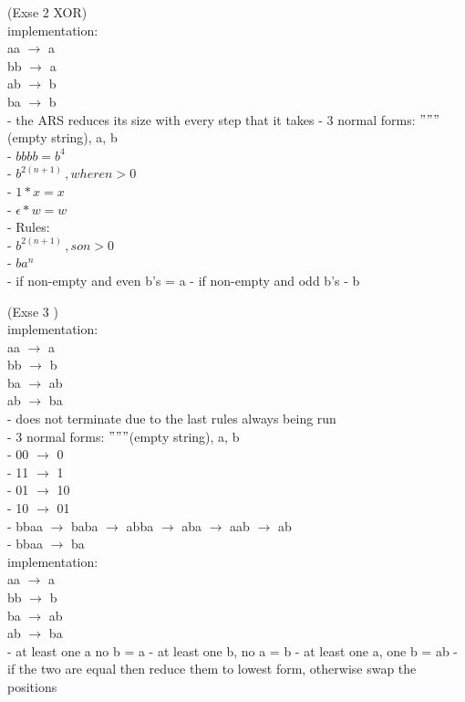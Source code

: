 \documentclass{article}
\theoremstyle{theorem}
\theoremstyle{definition}
\theoremstyle{remark}
\begin{document}
(Exse 2 XOR) \\ 
implementation: \\
aa $\to$ a \\
bb $\to$ a \\
ab $\to$ b \\
ba $\to$ b \\
- the ARS reduces its size with every step that it takes 
- 3 normal forms: $"""$ (empty string), a, b\\
- $bbbb = b^4$ \\
- $b^{2(n+1)} \, , where n > 0$ \\
- $1 * x = x$ \\
- $\epsilon * w = w$ \\

- Rules: \\
  - $b^{2(n+1)} \, , so n > 0$\\
  - $ba^n$\\
  - if non-empty and even b's = a 
  - if non-empty and odd b's - b


(Exse 3 ) \\ 
implementation: \\
aa $\to$ a \\
bb $\to$ b \\
ba $\to$ ab \\
ab $\to$ ba \\
- does not terminate due to the last rules always being run \\ 
- 3 normal forms: $"""$(empty string), a, b \\

- 00 $\to$ 0 \\
- 11 $\to$ 1 \\
- 01 $\to$ 10 \\
- 10 $\to$ 01 \\

- bbaa $\to$  baba $\to$  abba $\to$  aba $\to$  aab $\to$  ab \\
- bbaa $\to$  ba \\

implementation: \\
aa $\to$ a \\
bb $\to$ b \\
ba $\to$ ab \\
ab $\to$ ba \\

- at least one a no b = a
- at least one b, no a = b 
- at least one a, one b = ab 
- if the two are equal then reduce them to lowest form, otherwise swap the positions
\end{document}
